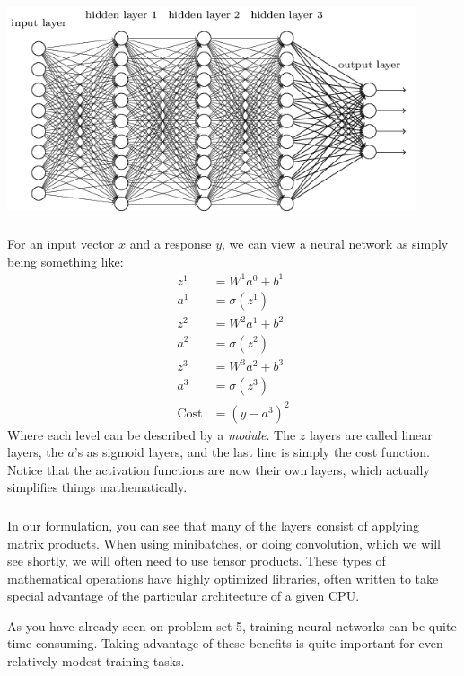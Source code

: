 \documentclass[xetex,mathserif,serif,aspectratio=169]{beamer}
\begin{document}
\begin{frame}[fragile] \frametitle{} \oldB \small

\begin{center}
\includegraphics[height=6cm]{img/tikz40.png}
\end{center}

\end{frame}

\begin{frame}[fragile] \frametitle{} \oldB \small

For an input vector $x$ and a response $y$, we can view a neural network
as simply being something like:
\begin{align}
z^1 &= W^1 a^0 + b^1 \\
a^1 &= \sigma(z^1) \\
z^2 &= W^2 a^1 + b^2 \\
a^2 &= \sigma(z^2) \\
z^3 &= W^3 a^2 + b^3 \\
a^3 &= \sigma(z^3) \\
\text{Cost} &= (y - a^3)^2
\end{align}
Where each level can be described by a \textit{module}. The $z$ layers
are called linear layers, the $a$'s as sigmoid layers, and the last
line is simply the cost function. Notice that the activation functions
are now their own layers, which actually simplifies things mathematically.

\end{frame}

\begin{frame}[fragile] \frametitle{} \oldB \small

In our formulation, you can see that many of the layers consist of applying
matrix products. When using minibatches, or doing convolution, which we will
see shortly, we will often need to use tensor products. These types of mathematical
operations have highly optimized libraries, often written to take special
advantage of the particular architecture of a given CPU.

As you have already seen on problem set 5, training neural networks can be
quite time consuming. Taking advantage of these benefits is quite important
for even relatively modest training tasks.

\end{frame}
\end{document}
